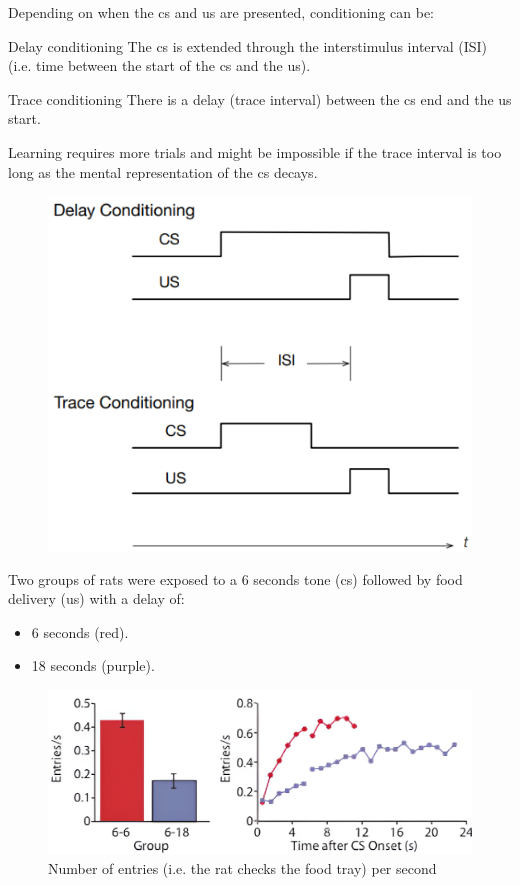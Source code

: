Depending on when the \ac{cs} and \ac{us} are presented, conditioning can be:
\begin{descriptionlist}
    \item[Delay conditioning] 
        The \ac{cs} is extended through the interstimulus interval (ISI) (i.e. time between the start of the \ac{cs} and the \ac{us}).

    \item[Trace conditioning] 
        There is a delay (trace interval) between the \ac{cs} end and the \ac{us} start.

        Learning requires more trials and might be impossible if the trace interval is too long as the mental representation of the \ac{cs} decays.

    \begin{figure}[H]
        \centering
        \includegraphics[width=0.45\linewidth]{./img/contiguity.png}
    \end{figure}
\end{descriptionlist}

\begin{casestudy}
    Two groups of rats were exposed to a 6 seconds tone (\ac{cs}) followed by food delivery (\ac{us}) with a delay of: 
    \begin{itemize}
        \item 6 seconds (red).
        \item 18 seconds (purple).
    \end{itemize}

    \begin{figure}[H]
        \centering
        \includegraphics[width=0.55\linewidth]{./img/contiguity_rats.png}
        \caption{Number of entries (i.e. the rat checks the food tray) per second}
    \end{figure}
\end{casestudy}


